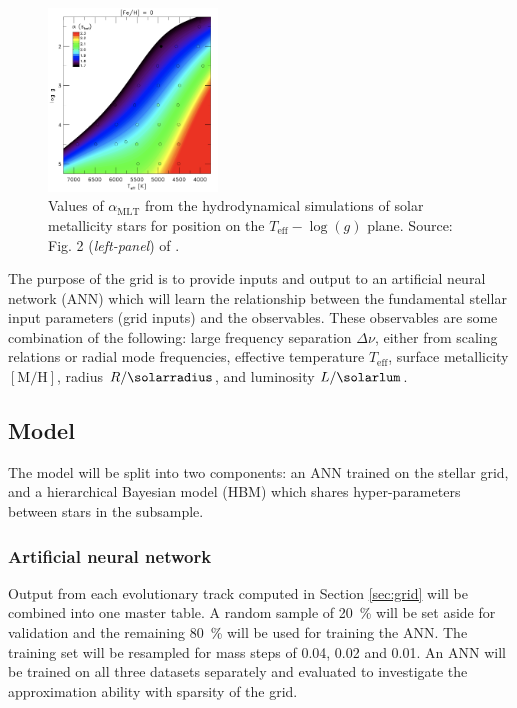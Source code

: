 \documentclass[twocolumn]{aastex63}
\newcommand{\Dnu}{\Delta\nu}
\newcommand{\mlt}{\alpha_{\mathrm{MLT}}}
\newcommand{\metallicity}{[\mathrm{M} / \mathrm{H}]}
\newcommand{\Teff}{T_{\mathrm{eff}}}
\begin{document}
\begin{figure}[htb!]
    \centering
    \includegraphics[width=0.4\textwidth]{figures/magic2015_mixing-length.png}
    \caption{Values of $\mlt$ from the hydrodynamical simulations of solar metallicity stars for position on the $\Teff - \log(g)$ plane. Source: Fig. 2 (\textit{left-panel}) of \citet{Magic.Weiss.ea2015}.}
    \label{fig:mlt}
\end{figure}

The purpose of the grid is to provide inputs and output to an artificial neural network (ANN) which will learn the relationship between the fundamental stellar input parameters (grid inputs) and the observables. These observables are some combination of the following: large frequency separation $\Dnu$, either from scaling relations or radial mode frequencies, effective temperature $\Teff$, surface metallicity $\metallicity$, radius $R/\si{\solarradius}$, and  luminosity $L/\si{\solarlum}$.

\subsection{Model}

The model will be split into two components: an ANN trained on the stellar grid, and a hierarchical Bayesian model (HBM) which shares hyper-parameters between stars in the subsample.

\subsubsection{Artificial neural network}

Output from each evolutionary track computed in Section \ref{sec:grid} will be combined into one master table. A random sample of \SI{20}{\percent} will be set aside for validation and the remaining \SI{80}{\percent} will be used for training the ANN. The training set will be resampled for mass steps of \SI{0.04}{\solarmass}, \SI{0.02}{\solarmass} and \SI{0.01}{\solarmass}. An ANN will be trained on all three datasets separately and evaluated to investigate the approximation ability with sparsity of the grid.
\end{document}
